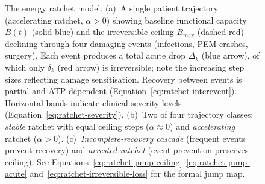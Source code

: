\begin{figure}[htbp]
\caption{The energy ratchet model. (a)~A single patient trajectory
(accelerating ratchet, $\alpha > 0$) showing baseline functional capacity
$B(t)$ (solid blue) and the irreversible ceiling $B_{\max}$ (dashed red)
declining through four damaging events (infections, PEM crashes, surgery).
Each event produces a total acute drop $\Delta_k$ (blue arrow), of which
only $\delta_k$ (red arrow) is irreversible; note the increasing step sizes
reflecting damage sensitisation. Recovery between events is partial and
ATP-dependent (Equation~\ref{eq:ratchet-interevent}). Horizontal bands
indicate clinical severity levels (Equation~\ref{eq:ratchet-severity}).
(b)~Two of four trajectory classes: \emph{stable} ratchet with equal ceiling
steps ($\alpha \approx 0$) and \emph{accelerating} ratchet ($\alpha > 0$).
(c)~\emph{Incomplete-recovery cascade} (frequent events prevent recovery)
and \emph{arrested ratchet} (event prevention preserves ceiling).
See Equations~\ref{eq:ratchet-jump-ceiling}--\ref{eq:ratchet-jump-acute}
and~\ref{eq:ratchet-irreversible-loss} for the formal jump map.}
\label{fig:energy-ratchet}
\end{figure}
